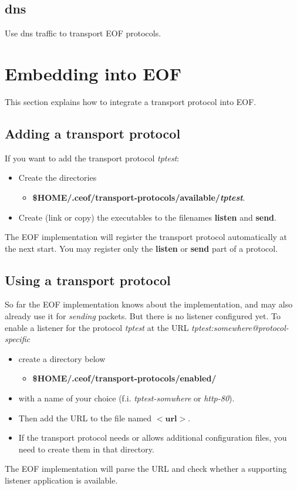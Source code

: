 \documentclass[12pt,a4paper]{book}
\begin{document}
\subsection{dns}
Use dns traffic to transport EOF protocols.

\section{Embedding into EOF}
This section explains how to integrate a transport protocol into EOF.
\subsection{Adding a transport protocol}
If you want to add the transport protocol \emph{tptest}:
\begin{itemize}
\item Create the directories
\begin{itemize}
\item \textbf{\$HOME/.ceof/transport-protocols/available/\emph{tptest}}.
\end{itemize}
\item Create (link or copy) the executables to the filenames \textbf{listen}
and \textbf{send}.
\end{itemize}
The EOF implementation will register the transport protocol automatically
at the next start. You may register only the \textbf{listen} or
\textbf{send} part of a protocol.
\subsection{Using a transport protocol}
So far the EOF implementation knows about the implementation, and may also
already use it for \emph{sending} packets. But there is no listener configured
yet.
To enable a listener for the protocol \emph{tptest} at the URL
\emph{tptest:somewhere@protocol-specific}
\begin{itemize}
\item create a directory below
\begin{itemize}
\item \textbf{\$HOME/.ceof/transport-protocols/enabled/}
\end{itemize}
\item with a name of your choice (f.i. \emph{tptest-somwhere} or \emph{http-80}).
\item Then add the URL to the file named $<\textbf{url}>$.
\item If the transport protocol needs or allows additional configuration files,
you need to create them in that directory.
\end{itemize}
The EOF implementation will parse the URL and check whether a supporting
listener application is available.
\end{document}
